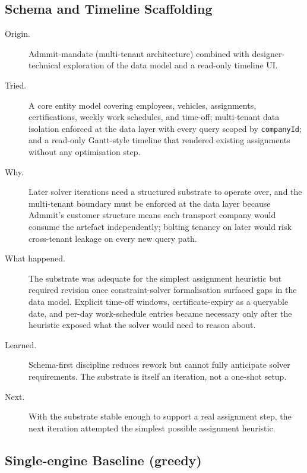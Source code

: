 \subsection{Schema and Timeline Scaffolding}
\label{sec:iter-schema}

\begin{description}
  \item[Origin.] Admmit-mandate (multi-tenant architecture) combined with designer-technical exploration of the data model and a read-only timeline UI.
  \item[Tried.] A core entity model covering employees, vehicles, assignments, certifications, weekly work schedules, and time-off; multi-tenant data isolation enforced at the data layer with every query scoped by \texttt{companyId}; and a read-only Gantt-style timeline that rendered existing assignments without any optimisation step.
  \item[Why.] Later solver iterations need a structured substrate to operate over, and the multi-tenant boundary must be enforced at the data layer because Admmit's customer structure means each transport company would consume the artefact independently; bolting tenancy on later would risk cross-tenant leakage on every new query path.
  \item[What happened.] The substrate was adequate for the simplest assignment heuristic but required revision once constraint-solver formalisation surfaced gaps in the data model. Explicit time-off windows, certificate-expiry as a queryable date, and per-day work-schedule entries became necessary only after the heuristic exposed what the solver would need to reason about.
  \item[Learned.] Schema-first discipline reduces rework but cannot fully anticipate solver requirements. The substrate is itself an iteration, not a one-shot setup.
  \item[Next.] With the substrate stable enough to support a real assignment step, the next iteration attempted the simplest possible assignment heuristic.
\end{description}

\subsection{Single-engine Baseline (greedy)}
\label{sec:iter-greedy}

